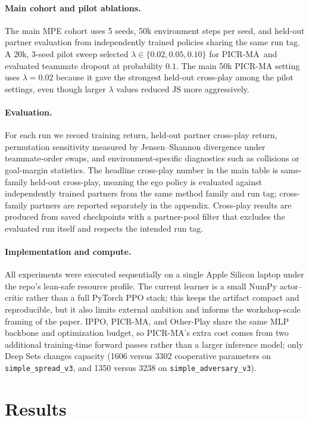 \documentclass{article}
\newcommand{\method}{PICR-MA}
\newcommand{\JS}{\mathrm{JS}}
\begin{document}
\paragraph{Main cohort and pilot ablations.}
The main MPE cohort uses 5 seeds, 50k environment steps per seed, and held-out partner evaluation from independently trained policies sharing the same run tag. A 20k, 3-seed pilot sweep selected $\lambda \in \{0.02, 0.05, 0.10\}$ for \method\ and evaluated teammate dropout at probability $0.1$. The main 50k PICR-MA setting uses $\lambda=0.02$ because it gave the strongest held-out cross-play among the pilot settings, even though larger $\lambda$ values reduced $\JS$ more aggressively.

\paragraph{Evaluation.}
For each run we record training return, held-out partner cross-play return, permutation sensitivity measured by Jensen--Shannon divergence under teammate-order swaps, and environment-specific diagnostics such as collisions or goal-margin statistics. The headline cross-play number in the main table is same-family held-out cross-play, meaning the ego policy is evaluated against independently trained partners from the same method family and run tag; cross-family partners are reported separately in the appendix. Cross-play results are produced from saved checkpoints with a partner-pool filter that excludes the evaluated run itself and respects the intended run tag.

\paragraph{Implementation and compute.}
All experiments were executed sequentially on a single Apple Silicon laptop under the repo's lean-safe resource profile. The current learner is a small NumPy actor--critic rather than a full PyTorch PPO stack; this keeps the artifact compact and reproducible, but it also limits external ambition and informs the workshop-scale framing of the paper. IPPO, \method, and Other-Play share the same MLP backbone and optimization budget, so \method's extra cost comes from two additional training-time forward passes rather than a larger inference model; only Deep Sets changes capacity (1606 versus 3302 cooperative parameters on \texttt{simple\_spread\_v3}, and 1350 versus 3238 on \texttt{simple\_adversary\_v3}).

\section{Results}
\end{document}
